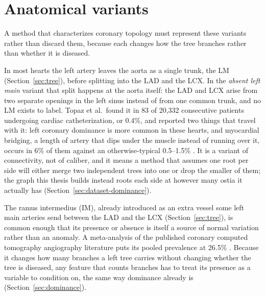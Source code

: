 
\section{Anatomical variants}
\label{sec:variants}

A method that characterizes coronary topology must represent these variants rather than discard
them, because each changes how the tree branches rather than whether it is diseased.

In most hearts the left artery leaves the aorta as a single trunk, the LM (Section~\ref{sec:tree}),
before splitting into the LAD and the LCX.
In the \emph{absent left main} variant that split happens at the aorta itself: the LAD and LCX
arise from two separate openings in the left sinus instead of from one common trunk, and no LM
exists to label.
Topaz et al.\ found it in 83 of 20{,}332 consecutive patients undergoing cardiac catheterization, or
0.4\%, and reported two things that travel with it: left coronary dominance is more common in these
hearts, and myocardial bridging, a length of artery that dips under the muscle instead of running
over it, occurs in 6\% of them against an otherwise-typical 0.5--1.5\% \cite{topaz1991absentlm}.
It is a variant of connectivity, not of caliber, and it means a method that assumes one root per
side will either merge two independent trees into one or drop the smaller of them; the graph this
thesis builds instead roots each side at however many ostia it actually has
(Section~\ref{sec:dataset-dominance}).

The ramus intermedius (IM), already introduced as an extra vessel some left main arteries send
between the LAD and the LCX (Section~\ref{sec:tree}), is common enough that its presence or absence
is itself a source of normal variation rather than an anomaly.
A meta-analysis of the published coronary computed tomography angiography literature puts its
pooled prevalence at 26.5\% \cite{dai2025ramus}.
Because it changes how many branches a left tree carries without changing whether the tree is
diseased, any feature that counts branches has to treat its presence as a variable to condition on,
the same way dominance already is (Section~\ref{sec:dominance}).
